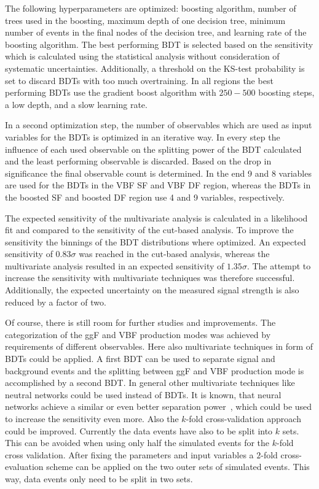 The following hyperparameters are optimized: boosting algorithm, number of trees used in the boosting, maximum depth of one decision tree,
minimum number of events in the final nodes of the decision tree, and learning rate of the boosting algorithm.
The best performing BDT is selected based on the sensitivity which is calculated using the statistical analysis without consideration of systematic uncertainties.
Additionally, a threshold on the KS-test probability is set to discard BDTs with too much overtraining.
In all regions the best performing BDTs use the gradient boost algorithm with $250 - 500$ boosting steps, a low depth, and a slow learning rate.

In a second optimization step, the number of observables which are used as input variables for the BDTs is optimized in
an iterative way.
In every step the influence of each used observable on the splitting power of the BDT calculated and the least performing observable is discarded.
Based on the drop in significance the final observable count is determined.
In the end 9 and 8 variables are used for the BDTs in the VBF SF and VBF DF region, whereas the BDTs in the boosted SF
and boosted DF region use 4 and 9 variables, respectively.

The expected sensitivity of the multivariate analysis is calculated in a likelihood fit and compared to the sensitivity of
the cut-based analysis.
To improve the sensitivity the binnings of the BDT distributions where optimized.
An expected sensitivity of $0.83\sigma$ was reached in the cut-based analysis, whereas the multivariate analysis resulted in
an expected sensitivity of $1.35\sigma$.
The attempt to increase the sensitivity with multivariate techniques was therefore successful.
Additionally, the expected uncertainty on the measured signal strength is also reduced by a factor of two.

Of course, there is still room for further studies and improvements.
The categorization of the ggF and VBF production modes was achieved by requirements of different observables.
Here also multivariate techniques in form of BDTs could be applied.
A first BDT can be used to separate signal and background events and the splitting between ggF and VBF production
mode is accomplished by a second BDT\@.
In general other multivariate techniques like neutral networks could be used instead of BDTs.
It is known, that neural networks achieve a similar or even better separation power~\cite{TMVA}, which could be used to increase
the sensitivity even more.
Also the $k$-fold cross-validation approach could be improved.
Currently the data events have also to be split into $k$ sets.
This can be avoided when using only half the simulated events for the $k$-fold cross validation.
After fixing the parameters and input variables a $2$-fold cross-evaluation scheme can be applied on the two outer sets of simulated events.
This way, data events only need to be split in two sets.
